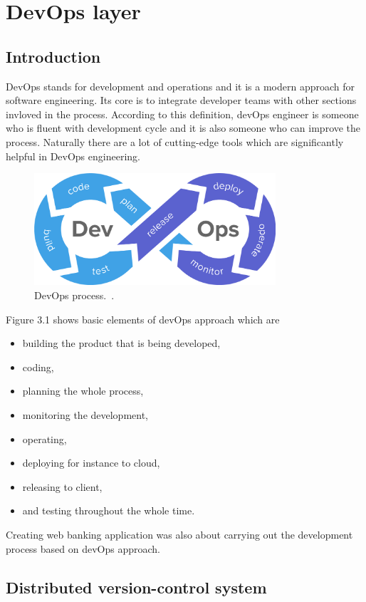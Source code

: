 \documentclass[a4paper,12pt]{book}
\newcommand\tab[1][1cm]{\hspace*{#1}}
\begin{document}
{{     
}

\chapter{DevOps layer}
\section{Introduction}
{
\tab DevOps stands for development and operations and it is a modern approach for software engineering. Its core is to integrate developer teams with other sections invloved in the process. According to this definition, devOps engineer is someone who is fluent with development cycle and it is also someone who can improve the process. Naturally there are a lot of cutting-edge tools which are significantly helpful in DevOps engineering. 

\bigskip
\begin{figure}[H]
  \centering
    \includegraphics[width=0.8\textwidth]{devops}
    \caption{DevOps process.~\cite{devops}.}
\end{figure}
    
Figure 3.1 shows basic elements of devOps approach which are
\begin{itemize}
	\item building the product that is being developed,
	\item coding,
	\item planning the whole process,
	\item monitoring the development,
	\item operating,
	\item deploying for instance to cloud,
	\item releasing to client,
	\item and testing throughout the whole time.
\end{itemize} 
	
\bigskip
Creating web banking application was also about carrying out the development process based on devOps approach. 
}
\section{Distributed version-control system}}
\end{document}
